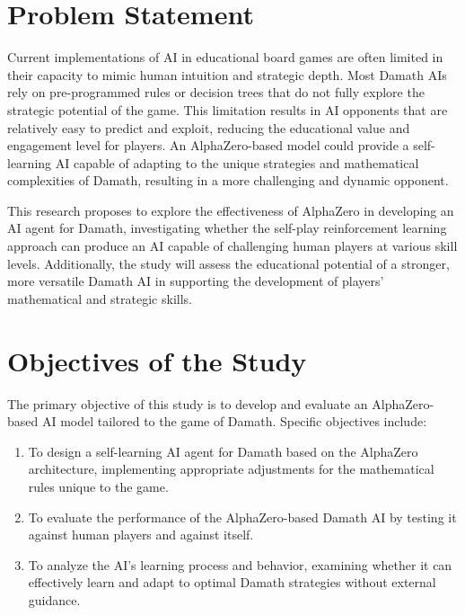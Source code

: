 \section{Problem Statement}

Current implementations of AI in educational board games are often limited in their capacity to mimic human intuition and strategic depth. Most Damath AIs rely on pre-programmed rules or decision trees that do not fully explore the strategic potential of the game. This limitation results in AI opponents that are relatively easy to predict and exploit, reducing the educational value and engagement level for players. An AlphaZero-based model could provide a self-learning AI capable of adapting to the unique strategies and mathematical complexities of Damath, resulting in a more challenging and dynamic opponent.

This research proposes to explore the effectiveness of AlphaZero in developing an AI agent for Damath, investigating whether the self-play reinforcement learning approach can produce an AI capable of challenging human players at various skill levels. Additionally, the study will assess the educational potential of a stronger, more versatile Damath AI in supporting the development of players’ mathematical and strategic skills.

\section{Objectives of the Study}

The primary objective of this study is to develop and evaluate an AlphaZero-based AI model tailored to the game of Damath. Specific objectives include:
\begin{enumerate}
    \item To design a self-learning AI agent for Damath based on the AlphaZero architecture, implementing appropriate adjustments for the mathematical rules unique to the game.
    \item To evaluate the performance of the AlphaZero-based Damath AI by testing it against human players and against itself.
    \item To analyze the AI’s learning process and behavior, examining whether it can effectively learn and adapt to optimal Damath strategies without external guidance.
\end{enumerate}

